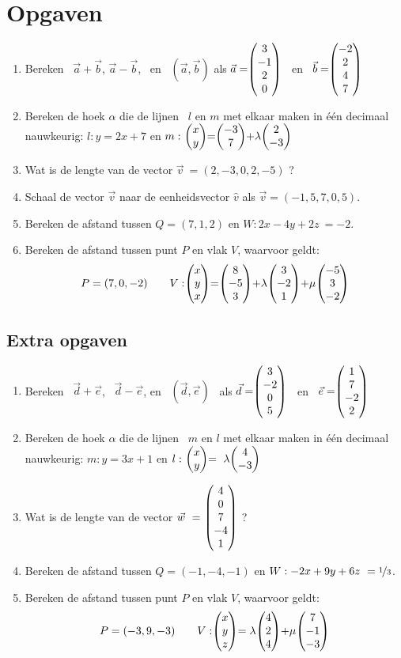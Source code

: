 \newpage
\section{Opgaven}
\begin{enumerate}
    \setlength{\itemsep}{10pt}
	\item  Bereken \ $ \vec{a} + \vec{b} $, \quad $ \vec{a} - \vec{b} $, \ en \ $  (\vec{a} , \vec{b}) $  als $ \vec{a} = \vecvier{3}{-1}{2}{0}  $ \  en \  $  \vec{b} =  \vecvier{-2}{2}{4}{7} $ 
	
	\item  Bereken de hoek $\alpha$ die de  lijnen \ $  l $ en $ m $ met elkaar maken in één decimaal nauwkeurig:
	$ l:  y = 2x +7  $ en $ m: \  \vectwee{x}{y} = \vectwee{-3}{7} + \lambda \vectwee{2}{-3}  $
	
	\item Wat is de lengte van de vector $  \vec{v} \ = (2, -3, 0, 2, -5) $ ?
	
	\item Schaal de vector $  \vec{v} $ naar de eenheidsvector $\hat{v}$ als $ \vec{v} = (-1, 5, 7, 0, 5) $.
	
	\item Bereken de afstand tussen  $  Q = (7,1,2)  $ en $ W:2x - 4y +2z \ = -2 $.
  
	\item Bereken de afstand tussen punt $P$ en vlak $V$, waarvoor geldt: 
    \[
      P=(7,0,-2) \qquad V:\vecdrie{x}{y}{x} = \vecdrie{8}{-5}{3} + \lambda\vecdrie{3}{-2}{1} + \mu \vecdrie{-5}{3}{-2} 
    \]
\end{enumerate}

\subsection{Extra opgaven}
\begin{enumerate}
    \setlength{\itemsep}{10pt}
	\item Bereken \ $ \vec{d} + \vec{e} $, \ $ \vec{d} - \vec{e} $, en \ $  (\vec{d} , \vec{e}) $ \ als 
	\quad $ \vec{d} = \vecvier{3}{-2}{0}{5}  $ \  en \  $  \vec{e} =  \vecvier{1}{7}{-2}{2} $
	
	\item  Bereken de hoek $\alpha$ die de  lijnen \ $  m $ en $ l $ met elkaar maken in één decimaal nauwkeurig:
	$ m:  y = 3x + 1  $ en $ l: \  \vectwee{x}{y} = \  \lambda \vectwee{4}{-3} $
	
	\item Wat is de lengte van de vector $  \vec{w} \ = \ \vecvijf{4}{0}{7}{-4}{1} $ ?

    \item Bereken de afstand tussen  $  Q = (-1,-4,-1)  $ en $W:-2x + 9y + 6z \ = \nicefrac{1}{3} $. 

	\item Bereken de afstand tussen punt $P$ en vlak $V$, waarvoor geldt: 
    \[P = (-3,9,-3)  \qquad V:\vecdrie{x}{y}{z} =\lambda\vecdrie{4}{2}{4} + \mu\vecdrie{7}{-1}{-3} \]
\end{enumerate}

